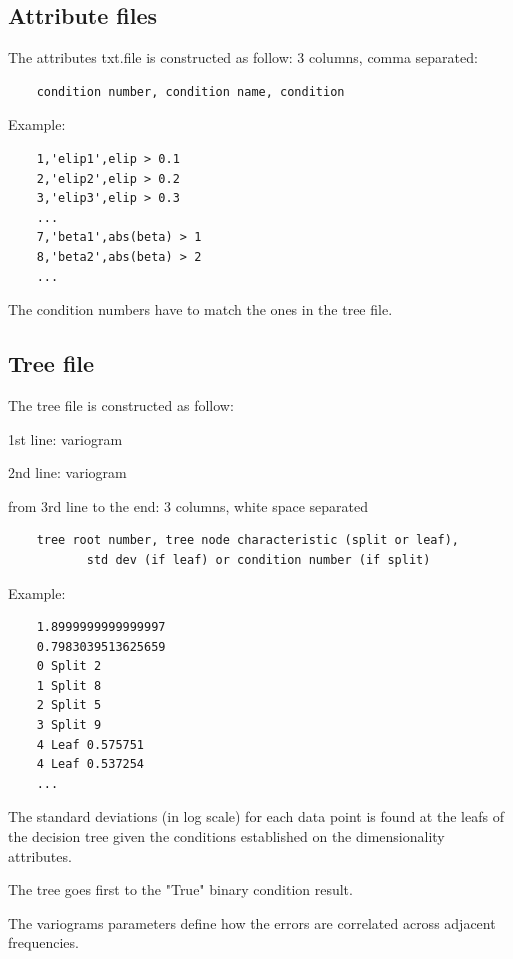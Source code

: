\documentclass[]{scrartcl}
\begin{document}
    \subsection{Attribute files}
    
    The attributes txt.file is constructed as follow:
    3 columns, comma separated:
    \begin{verbatim}
    condition number, condition name, condition
    \end{verbatim}  
    
    Example:   
    \begin{verbatim}	
	1,'elip1',elip > 0.1
	2,'elip2',elip > 0.2
	3,'elip3',elip > 0.3
	...
	7,'beta1',abs(beta) > 1
	8,'beta2',abs(beta) > 2
	...
    \end{verbatim} 
    
    The condition numbers have to match the ones in the tree file.
    
    \subsection{Tree file}
    
    The tree file is constructed as follow: 
    
    1st line: variogram
    
    2nd line: variogram
    
    from 3rd line to the end: 3 columns, white space separated
    
    \begin{verbatim}
    tree root number, tree node characteristic (split or leaf), 
           std dev (if leaf) or condition number (if split)
    \end{verbatim}  
    
    Example:   
    \begin{verbatim}
    1.8999999999999997
    0.7983039513625659
    0 Split 2
    1 Split 8
    2 Split 5
    3 Split 9
    4 Leaf 0.575751 
    4 Leaf 0.537254 
    ...    
    \end{verbatim} 
    

    The standard deviations (in log scale) for each data point is found at the leafs of the decision tree given the conditions established on the dimensionality attributes.
    
    The tree goes first to the "True" binary condition result.
    
    
    The variograms parameters define how the errors are correlated across adjacent frequencies. 
    
\end{document}
